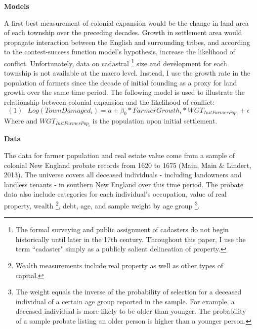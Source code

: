 \documentclass[11pt, oneside]{article}
\begin{document}
\noindent\textbf{Models}

A first-best measurement of colonial expansion would be the change in land area of each township over the preceding decades. Growth in settlement area would propagate interaction between the English and surrounding tribes, and according to the contest-success function model's hypothesis, increase the likelihood of conflict. Unfortunately, data on cadastral \footnote{The formal surveying and public assignment of cadasters do not begin historically until later in the 17th century. Throughout this paper, I use the term ``cadaster" simply as a publicly salient delineation of property.} size and development for each township is not available at the macro level. Instead, I use the growth rate in the population of farmers since the decade of initial founding as a proxy for land growth over the same time period.
The following model is used to illustrate the relationship between colonial expansion and the likelihood of conflict:
\[ (1) \ \ \ Log(TownDamaged_{i}) = a + \beta_0*FarmerGrowth_{i}*WGT_{InitFarmerPop_{i}} + \epsilon
\]
\noindent Where and $WGT_{InitFarmerPop_{i}}$ is the population upon initial settlement.

\noindent\textbf{Data}

The data for farmer population and real estate value come from a sample of colonial New England probate records from 1620 to 1675 (Main, Main \& Lindert, 2013). The universe covers all deceased individuals - including landowners and landless tenants - in southern New England over this time period. The probate data also include categories for each individual's occupation, value of real property, wealth \footnote{Wealth measurements include real property as well as other types of capital.}, debt, age, and sample weight by age group \footnote{The weight equals the inverse of the probability of selection for a deceased individual of a certain age group reported in the sample. For example, a deceased individual is more likely to be older than younger. The probability of a sample probate listing an older person is higher than a younger person.}.
\end{document}
